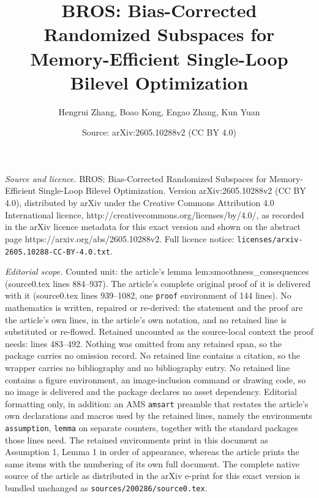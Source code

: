 \documentclass[10pt,a4paper]{amsart}
\title{BROS: Bias-Corrected Randomized Subspaces for Memory-Efficient Single-Loop Bilevel Optimization}
\author{Hengrui Zhang, Boao Kong, Engao Zhang, Kun Yuan}
\date{Source: arXiv:2605.10288v2 (CC BY 4.0)}
\begin{document}
\maketitle

\noindent\emph{Source and licence.} BROS: Bias-Corrected Randomized Subspaces for Memory-Efficient Single-Loop Bilevel Optimization. Version arXiv:2605.10288v2 (CC BY 4.0), distributed by arXiv under the Creative Commons Attribution 4.0 International licence, http://creativecommons.org/licenses/by/4.0/, as recorded in the arXiv licence metadata for this exact version and shown on the abstract page https://arxiv.org/abs/2605.10288v2. Full licence notice: \texttt{licenses/arxiv-2605.10288-CC-BY-4.0.txt}.\par\smallskip

\noindent\textit{Editorial scope.} Counted unit: the article's lemma lem:smoothness\_consequences (source0.tex lines 884--937). The article's complete original proof of it is delivered with it (source0.tex lines 939--1082, one \texttt{proof} environment of 144 lines). No mathematics is written, repaired or re-derived: the statement and the proof are the article's own lines, in the article's own notation, and no retained line is substituted or re-flowed.  Retained uncounted as the source-local context the proof needs: lines 483--492.  Nothing was omitted from any retained span, so the package carries no omission record.  No retained line contains a citation, so the wrapper carries no bibliography and no bibliography entry.  No retained line contains a figure environment, an image-inclusion command or drawing code, so no image is delivered and the package declares no asset dependency.  Editorial formatting only, in addition: an AMS \texttt{amsart} preamble that restates the article's own declarations and macros used by the retained lines, namely the environments \texttt{assumption}, \texttt{lemma} on separate counters, together with the standard packages those lines need.  The retained environments print in this document as Assumption 1, Lemma 1 in order of appearance, whereas the article prints the same items with the numbering of its own full document.  The complete native source of the article as distributed in the arXiv e-print for this exact version is bundled unchanged as \texttt{sources/200286/source0.tex}.
\end{document}
